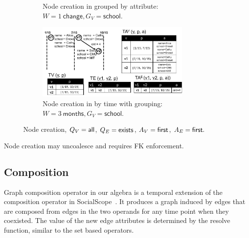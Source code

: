 \begin{figure}[t]
\begin{subfigure}[b]{0.5\textwidth}
\caption{Node creation in  grouped by attribute:
  $W=1~\textsf{change}, G_V=\textsf{school}$.}
\label{fig:tg_agg3}
\end{subfigure}
\begin{subfigure}[b]{0.4\textwidth}
\includegraphics[width=3in]{figs/agg4.pdf}
\caption{Node creation in  by time with grouping:
  $W=3~\textsf{months}, G_V=\textsf{school}$.}
\label{fig:tg_agg4}
\end{subfigure}
\caption[]{Node creation, $Q_V=\textsf{all}$, $Q_E=\textsf{exists}$,
  $A_V=\textsf{first}$, $A_E=\textsf{first}.$}
\label{fig:tg_agg}
\vspace{-0.5cm}
\end{figure}

Node creation may uncoalesce and requires FK enforcement.


\subsection{Composition}
\label{sec:algebra:composition}


Graph composition operator in our algebra is a temporal extension of
the composition operator in SocialScope~\cite{Amer-Yahia2009}.  It
produces a graph induced by edges that are composed from edges in the
two operands for any time point when they coexisted.  The value of the
new edge attributes is determined by the resolve function, similar to
the set based operators.

